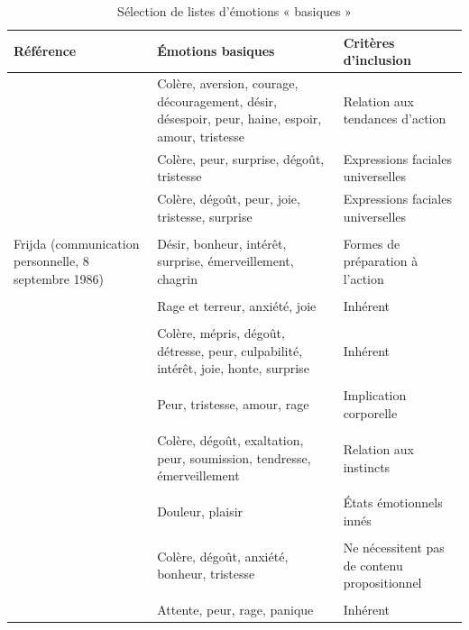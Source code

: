\documentclass[a4paper,12pt, openany]{book}
\begin{document}
\begin{table}[!ht]
    \centering

    \caption{Sélection de listes d'émotions « basiques »}
    \label{tab:basiques}    
    \begin{tabular}{p{4cm} p{7cm} p{4.3cm}}
        \hline
        \textbf{Référence} & \textbf{Émotions basiques} & \textbf{Critères d'inclusion} \\
        \hline
	    \textcite{arnold60} & \raggedright Colère, aversion, courage, découragement, désir, désespoir, peur, haine, espoir, amour, tristesse & \raggedright Relation aux tendances d'action \tabularnewline
        \textcite{darwin1872} & Colère, peur, surprise, dégoût, tristesse & Expressions faciales universelles \\
       \raggedright \textcite{ekman82} & \raggedright Colère, dégoût, peur, joie, tristesse, surprise & \raggedright Expressions faciales universelles \tabularnewline
        &&\\
      \raggedright  Frijda (communication personnelle, 8 septembre 1986) & \raggedright Désir, bonheur, intérêt, surprise, émerveillement, chagrin & \raggedright Formes de préparation à l'action \tabularnewline
        &&\\
        \raggedright \textcite{gray84} & \raggedright Rage et terreur, anxiété, joie & \raggedright Inhérent \tabularnewline
        &&\\
        \raggedright \textcite{izard71} & \raggedright Colère, mépris, dégoût, détresse, peur, culpabilité, intérêt, joie, honte, surprise & \raggedright Inhérent \tabularnewline
        &&\\
        \raggedright \textcite{james1884} & \raggedright Peur, tristesse, amour, rage & \raggedright Implication corporelle \tabularnewline
        &&\\
        \raggedright \textcite{mcdougall26} & \raggedright Colère, dégoût, exaltation, peur, soumission, tendresse, émerveillement & \raggedright Relation aux instincts \tabularnewline
        &&\\
       \raggedright \textcite{mowrer60} & \raggedright Douleur, plaisir & \raggedright États émotionnels innés \tabularnewline
        &&\\
        \raggedright \textcite{oatley87} & \raggedright Colère, dégoût, anxiété, bonheur, tristesse & \raggedright Ne nécessitent pas de contenu propositionnel \tabularnewline
        &&\\
        \raggedright \textcite{panksepp82} & \raggedright Attente, peur, rage, panique & \raggedright Inhérent \tabularnewline

\end{tabular}
\end{table}
\end{document}
